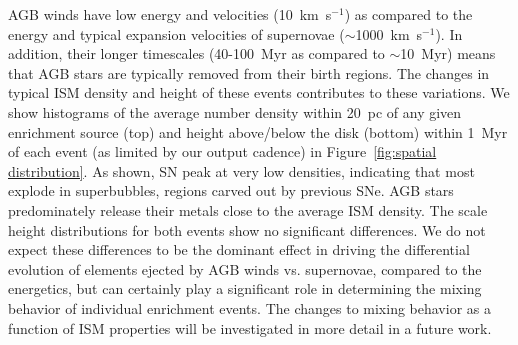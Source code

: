 \documentclass[twocolumn]{aastex61}
\begin{document}
AGB winds have low energy and velocities (10~km~s$^{-1}$) as compared to the energy and typical expansion velocities of supernovae ($\sim$1000~km~s$^{-1}$). In addition, their longer timescales (40-100~Myr as compared to $\sim$10~Myr) means that AGB stars are typically removed from their birth regions. The changes in typical ISM density and height of these events contributes to these variations. We show histograms of the average number density within 20~pc of any given enrichment source (top) and height above/below the disk (bottom) within 1~Myr of each event (as limited by our output cadence) in Figure~\ref{fig:spatial distribution}. As shown, SN peak at very low densities, indicating that most explode in superbubbles, regions carved out by previous SNe. AGB stars predominately release their metals close to the average ISM density. The scale height distributions for both events show no significant differences. We do not expect these differences to be the dominant effect in driving the differential evolution of elements ejected by AGB winds vs. supernovae, compared to the energetics, but can certainly play a significant role in determining the mixing behavior of individual enrichment events. The changes to mixing behavior as a function of ISM properties will be investigated in more detail in a future work.
\end{document}
